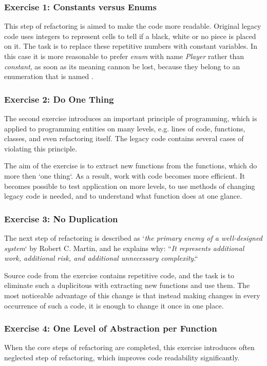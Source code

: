     \subsubsection{Exercise 1: Constants versus Enums}
    This step of refactoring is aimed to make the code more readable. Original legacy code uses integers to represent cells to tell if a black, white or no piece is placed on it. The task is to replace these repetitive numbers with constant variables. In this case it is more reasonable to prefer \textit{enum} with name \textit{Player} rather than \textit{constant}, as soon as its meaning cannon be lost, because they belong to an enumeration that is named \cite[Constants versus Enums]{clean_code}.
    
    \subsubsection{Exercise 2: Do One Thing}
    The second exercise introduces an important principle of programming, which is applied to programming entities on many levels, e.g. lines of code, functions, classes, and even refactoring itself. The legacy code contains several cases of violating this principle\cite[Do One Thing]{clean_code}.
    
    The aim of the exercise is to extract new functions from the functions, which do more then `one thing`. As a result, work with code becomes more efficient. It becomes possible to test application on more levels, to use methods of changing legacy code is needed, and to understand what function does at one glance.
    
    \subsubsection{Exercise 3: No Duplication}
    The next step of refactoring is described as `\textit{the primary enemy of a well-designed system}` by Robert C. Martin, and he explains why: ``\textit{It represents additional work, additional risk, and additional unnecessary complexity}\cite[No Duplication]{clean_code}.``
    
    Source code from the exercise contains repetitive code, and the task is to eliminate such a duplicitous with extracting new functions and use them. The most noticeable advantage of this change is that instead making changes in every occurrence of such a code, it is enough to change it once in one place.
    
    \subsubsection{Exercise 4: One Level of Abstraction per Function}
    When the core steps of refactoring are completed, this exercise introduces often neglected step of refactoring, which improves code readability significantly.
    
